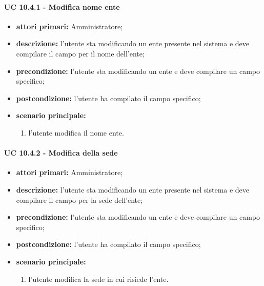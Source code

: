 				\paragraph{UC 10.4.1 - Modifica nome ente}
				\begin{itemize}
					\item \textbf{attori primari:} Amministratore;
					\item \textbf{descrizione:} l'utente sta modificando un ente presente nel sistema e deve compilare il campo per il nome dell'ente;
					\item \textbf{precondizione:} l'utente sta modificando un ente e deve compilare un campo specifico;
					\item \textbf{postcondizione:} l'utente ha compilato il campo specifico;
					\item \textbf{scenario principale:}
					\begin{enumerate}
						\item l'utente modifica il nome ente.
					\end{enumerate}	
				\end{itemize}	

				\paragraph{UC 10.4.2 - Modifica della sede}
				\begin{itemize}
					\item \textbf{attori primari:} Amministratore;
					\item \textbf{descrizione:} l'utente sta modificando un ente presente nel sistema e deve compilare il campo per la sede dell'ente;
					\item \textbf{precondizione:} l'utente sta modificando un ente e deve compilare un campo specifico;
					\item \textbf{postcondizione:} l'utente ha compilato il campo specifico;
					\item \textbf{scenario principale:}
					\begin{enumerate}
						\item l'utente modifica la sede in cui risiede l'ente.
					\end{enumerate}	
				\end{itemize}	


